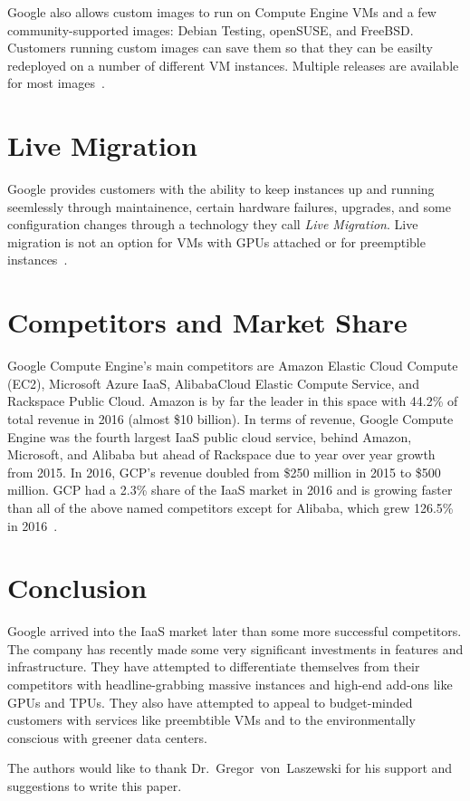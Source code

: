 Google also allows custom images to run on Compute Engine VMs and a
few community-supported images: Debian Testing, openSUSE, and
FreeBSD. Customers running custom images can save them so that they
can be easilty redeployed on a number of different VM
instances. Multiple releases are available for most images~\cite{hid-sp18-419-gce-images}.


\section{Live Migration}
Google provides customers with the ability to keep instances up and
running seemlessly through maintainence, certain hardware failures,
upgrades, and some configuration changes through a technology they
call \textit{Live Migration}. Live migration is not an option for VMs
with GPUs attached or for preemptible
instances~\cite{hid-sp18-419-gce-live-migration}.


\section{Competitors and Market Share}

Google Compute Engine's main competitors are Amazon Elastic Cloud
Compute (EC2), Microsoft Azure IaaS, AlibabaCloud Elastic Compute
Service, and Rackspace Public Cloud. Amazon is by far the leader in
this space with 44.2\% of total revenue in 2016 (almost \$10
billion). In terms of revenue, Google Compute Engine was the fourth
largest IaaS public cloud service, behind Amazon, Microsoft, and
Alibaba but ahead of Rackspace due to year over year growth from
2015. In 2016, GCP's revenue doubled from \$250 million in 2015
to \$500 million. GCP had a 2.3\% share of the IaaS market in 2016 and
is growing faster than all of the above named competitors except for
Alibaba, which grew 126.5\% in 2016~\cite{hid-sp18-419-gartnerpr2017}.


\section{Conclusion}

Google arrived into the IaaS market later than some more successful
competitors. The company has recently made some very significant
investments in features and infrastructure. They have attempted to
differentiate themselves from their competitors with headline-grabbing
massive instances and high-end add-ons like GPUs and TPUs. They also
have attempted to appeal to budget-minded customers with services like
preembtible VMs and to the environmentally conscious with greener data
centers.


\begin{acks}

  The authors would like to thank Dr.~Gregor~von~Laszewski for his
  support and suggestions to write this paper.

\end{acks}


 

